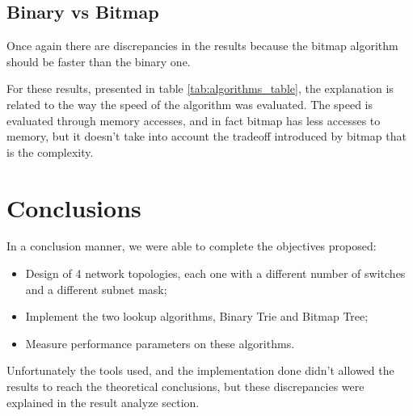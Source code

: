 \documentclass[]{report}
\begin{document}
\begin{minipage}{\linewidth}%
\label{tab:size_table}
\end{minipage}

\section{Binary vs Bitmap}
	Once again there are discrepancies in the results because the bitmap algorithm should be faster than the binary one. 
	
For these results, presented in table \ref{tab:algorithms_table}, the explanation is related to the way the speed of the algorithm was evaluated. The speed is evaluated through memory accesses, and in fact bitmap has less accesses to memory, but it doesn’t take into account the tradeoff introduced by bitmap that is the complexity.

 

\begin{minipage}{\linewidth}%
\label{tab:algorithms_table}
\end{minipage}


\chapter{Conclusions}
In a conclusion manner, we were able to complete the objectives proposed:
\begin{itemize}
\item Design of 4 network topologies, each one with a different number of switches and a different subnet mask;
\item Implement the two lookup algorithms, Binary Trie and Bitmap Tree;
\item Measure performance parameters on these algorithms.
\end{itemize}
Unfortunately the tools used, and the implementation done didn’t allowed the results to reach the theoretical conclusions, but these discrepancies were explained in the result analyze section. 
\end{document}
